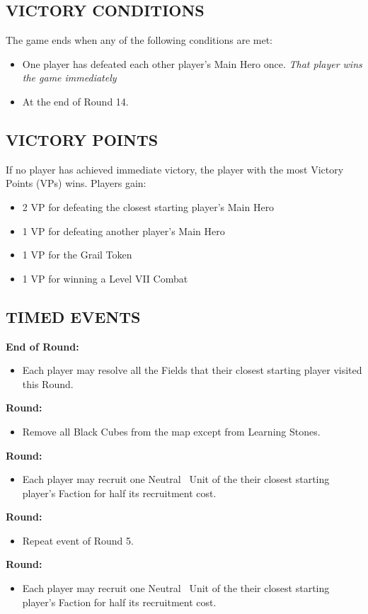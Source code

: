 \begin{multicols*}{2}
\subsection*{\MakeUppercase{Victory Conditions}}
The game ends when any of the following conditions are met:
\begin{itemize}
  \item One player has defeated each other player's Main Hero once. \textit{That player wins the game immediately}
  \item At the end of Round 14.
\end{itemize}

\subsection*{\MakeUppercase{Victory Points}}
If no player has achieved immediate victory, the player with the most Victory Points (VPs) wins. Players gain:
\begin{itemize}
  \item 2 VP for defeating the closest starting player's Main Hero
  \item 1 VP for defeating another player's Main Hero
  \item 1 VP for the Grail Token
  \item 1 VP for winning a Level VII Combat
\end{itemize}

\subsection*{\MakeUppercase{Timed Events}}
\textbf{End of  Round:}
\begin{itemize}
  \item Each player may resolve all the Fields that their closest starting player visited this Round.
\end{itemize}
\textbf{ Round:}
\begin{itemize}
  \item Remove all Black Cubes from the map except from Learning Stones.
\end{itemize}
\textbf{ Round:}
\begin{itemize}
  \item Each player may recruit one Neutral \silver\ Unit of the their closest starting player's Faction for half its recruitment cost.
\end{itemize}
\textbf{ Round:}
\begin{itemize}
  \item Repeat event of Round 5.
\end{itemize}
\textbf{ Round:}
\begin{itemize}
  \item Each player may recruit one Neutral \silver\ Unit of the their closest starting player's Faction for half its recruitment cost.
\end{itemize}


\end{multicols*}
